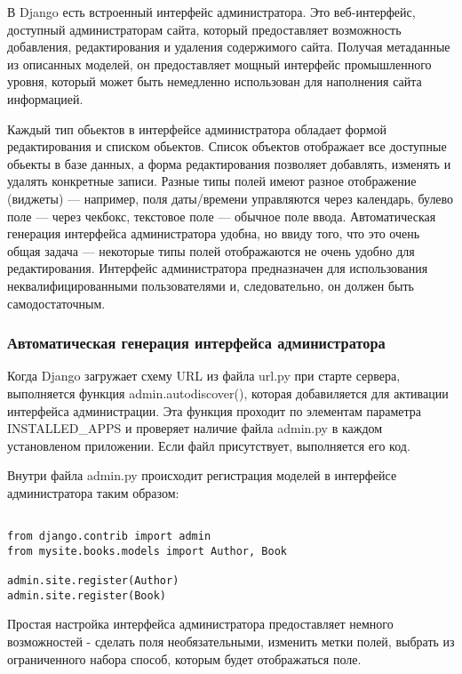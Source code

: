 \documentclass[a4paper]{report}
\begin{document}
В Django есть встроенный интерфейс администратора. Это веб-интерфейс, доступный администраторам сайта, который предоставляет возможность добавления, редактирования и удаления содержимого сайта. Получая метаданные из описанных моделей, он предоставляет мощный интерфейс промышленного уровня, который может быть немедленно использован для наполнения сайта информацией.

Каждый тип обьектов в интерфейсе администратора обладает формой редактирования и списком обьектов. Список объектов отображает все доступные обьекты в базе данных, а форма редактирования позволяет добавлять, изменять и удалять конкретные записи. 
Разные типы полей имеют разное отображение (виджеты) --- например, поля даты/времени управляются через календарь, булево поле --- через чекбокс, текстовое поле --- обычное поле ввода. 
Автоматическая генерация интерфейса администратора удобна, но ввиду того, что это очень общая задача --- некоторые типы полей отображаются не очень удобно для редактирования. Интерфейс администратора предназначен для использования неквалифицированными пользователями и, следовательно, он должен быть самодостаточным.

\subsubsection{Автоматическая генерация интерфейса администратора}

Когда Django загружает схему URL из файла url.py  при старте сервера, выполняется функция admin.autodiscover(), которая добавиляется для активации интерфейса администрации. Эта функция проходит по элементам параметра INSTALLED\_APPS и проверяет наличие файла admin.py в каждом установленом приложении. Если файл присутствует, выполняется его код. 

Внутри файла admin.py происходит регистрация моделей в интерфейсе администратора таким образом: 

{
\small \begin{verbatim}

from django.contrib import admin
from mysite.books.models import Author, Book

admin.site.register(Author)
admin.site.register(Book)

\end{verbatim}
}

Простая настройка интерфейса администратора предоставляет немного возможностей - сделать поля необязательными, изменить метки полей, выбрать из ограниченного набора способ, которым будет отображаться поле.
\end{document}
